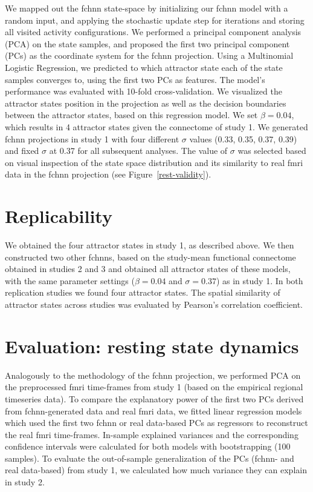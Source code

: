 \documentclass{article}
\begin{document}
We mapped out the \acrshort{fchnn} state-space by initializing our \acrshort{fchnn} model with a random input, and applying the stochastic update step for  iterations and storing all visited activity configurations.
We performed a principal component analysis (PCA) on the state samples, and proposed the first two principal component (PCs) as the coordinate system for the \acrshort{fchnn} projection. Using a Multinomial Logistic Regression, we predicted to which attractor state each of the state samples converges to, using the first two PCs as features. The model's performance was evaluated with 10-fold cross-validation. We visualized the attractor states position in the projection as well as the decision boundaries between the attractor states, based on this regression model. We set $\beta = 0.04$, which results in 4 attractor states given the connectome of study 1. We generated \acrshort{fchnn} projections in study 1 with four different $\sigma$ values (0.33, 0.35, 0.37, 0.39) and fixed $\sigma$ at 0.37 for all subsequent analyses. The value of $\sigma$ was selected based on visual inspection of the state space distribution and its similarity to real \acrshort{fmri} data in the \acrshort{fchnn} projection (see Figure~\ref{rest-validity}).

\section{Replicability}

We obtained the four attractor states in study 1, as described above. We then constructed two other \acrshort{fchnn}s, based on the study-mean functional connectome obtained in studies 2 and 3 and  obtained all attractor states of these models, with the same parameter settings ($\beta = 0.04$ and $\sigma = 0.37$) as in study 1. In both replication studies we found four attractor states. The spatial similarity of attractor states across studies was evaluated by Pearson's correlation coefficient.

\section{Evaluation: resting state dynamics}

Analogously to the methodology of the \acrshort{fchnn} projection, we performed PCA on the preprocessed \acrshort{fmri} time-frames from study 1 (based on the empirical regional timeseries data).
To compare the explanatory power of the first two PCs derived from \acrshort{fchnn}-generated data and real \acrshort{fmri} data, we fitted linear regression models which used the first two \acrshort{fchnn} or real data-based PCs as regressors to reconstruct the real \acrshort{fmri} time-frames. In-sample explained variances and the corresponding confidence intervals were calculated for both models with bootstrapping (100 samples). To evaluate the out-of-sample generalization of the PCs (\acrshort{fchnn}- and real data-based) from study 1, we calculated how much variance they can explain in study 2.
\end{document}

